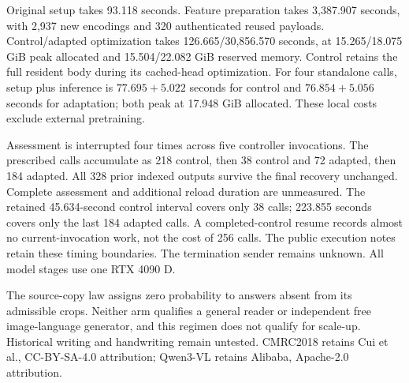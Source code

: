 Original setup takes 93.118 seconds. Feature preparation takes 3,387.907
seconds, with 2,937 new encodings and 320 authenticated reused payloads.
Control/adapted optimization takes 126.665/30,856.570 seconds, at
15.265/18.075 GiB peak allocated and 15.504/22.082 GiB reserved memory.
Control retains the full resident body during its cached-head optimization.
For four standalone calls, setup plus inference is $77.695+5.022$ seconds
for control and $76.854+5.056$ seconds for adaptation; both peak at 17.948
GiB allocated. These local costs exclude external pretraining.

Assessment is interrupted four times across five controller invocations.
The prescribed calls accumulate as 218 control, then 38 control and 72
adapted, then 184 adapted. All 328 prior indexed outputs survive the final
recovery unchanged. Complete assessment and additional reload duration are
unmeasured. The retained 45.634-second control interval covers only 38 calls;
223.855 seconds covers only the last 184 adapted calls. A completed-control
resume records almost no current-invocation work, not the cost of 256 calls.
The public execution notes retain these timing boundaries. The termination
sender remains unknown. All model stages use one RTX 4090 D.

The source-copy law assigns zero probability to answers absent from its
admissible crops. Neither arm qualifies a general reader or independent free
image-language generator, and this regimen does not qualify for scale-up.
Historical writing and handwriting remain untested. CMRC2018 retains
Cui et al.\cite{cmrc}, CC-BY-SA-4.0 attribution; Qwen3-VL retains Alibaba,
Apache-2.0 attribution.

\clearpage
{}
